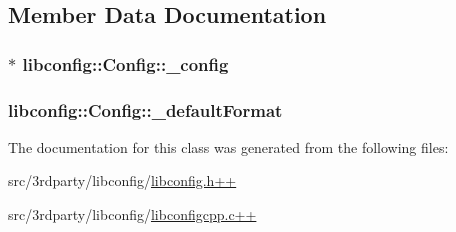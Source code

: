 \subsection{Member Data Documentation}
\hypertarget{classlibconfig_1_1Config_ac8440fe53e4bd0f1f9663d99e5c63322}{
\subsubsection[{\-\_\-config}]{$\ast$ libconfig\-::\-Config\-::\-\_\-config\hspace{0.3cm}{\ttfamily [private]}}}\label{classlibconfig_1_1Config_ac8440fe53e4bd0f1f9663d99e5c63322}
\hypertarget{classlibconfig_1_1Config_a6fdc2ad386a58b7d8715db0453658bb6}{
\subsubsection[{\-\_\-default\-Format}]{ libconfig\-::\-Config\-::\-\_\-default\-Format\hspace{0.3cm}{\ttfamily [private]}}}\label{classlibconfig_1_1Config_a6fdc2ad386a58b7d8715db0453658bb6}


The documentation for this class was generated from the following files\-:\begin{DoxyCompactItemize}
\item 
src/3rdparty/libconfig/\hyperlink{libconfig_8h_09_09}{libconfig.\-h++}\item 
src/3rdparty/libconfig/\hyperlink{libconfigcpp_8c_09_09}{libconfigcpp.\-c++}\end{DoxyCompactItemize}
